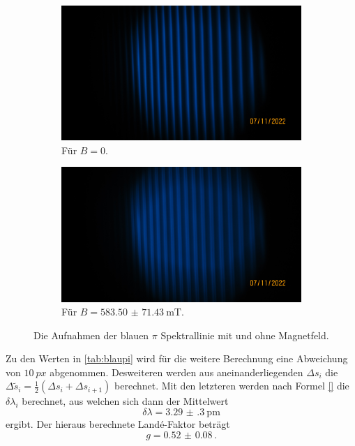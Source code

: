     \begin{figure}%
      \begin{subfigure}{0.48\textwidth}%
        \centering%
        \includegraphics[width=\textwidth]{pictures/IMG_0009.JPG}%
        \caption{Für $B = \num{0}$.}%
        \label{fig:pic_blaup_0}%
      \end{subfigure}%
      \hfill%
      \begin{subfigure}{0.48\textwidth}%
        \centering%
        \includegraphics[width=\textwidth]{pictures/IMG_0010.JPG}%
        \caption{Für $B = \SI{583.50(7143)}{\milli\tesla}$.}%
        \label{fig:pic_blaup_B}%
      \end{subfigure}%
      \caption{Die Aufnahmen der blauen $\pi$ Spektrallinie mit und ohne Magnetfeld.}%
      \label{fig:blaup}%
    \end{figure}

    \noindent
    Zu den Werten in \autoref{tab:blaupi} wird für die weitere Berechnung eine Abweichung von $\SI{10}{px}$ abgenommen. Desweiteren werden aus aneinanderliegenden 
    $\Delta s_i$ die $\Delta \tilde{s}_i = \frac{1}{2} (\Delta s_i + \Delta s_{i+1})$ berechnet. Mit den letzteren werden nach Formel \eqref{} 
    die $\delta \lambda_i$ berechnet, aus welchen sich dann der Mittelwert 
    \begin{equation*}
      \delta \lambda = \SI{3.29(30)}{\pico\metre}
    \end{equation*}
    ergibt. Der hieraus berechnete Land\'{e}-Faktor beträgt 
    \begin{equation*}
      g = \num{0.52(8)}\, .
    \end{equation*}

